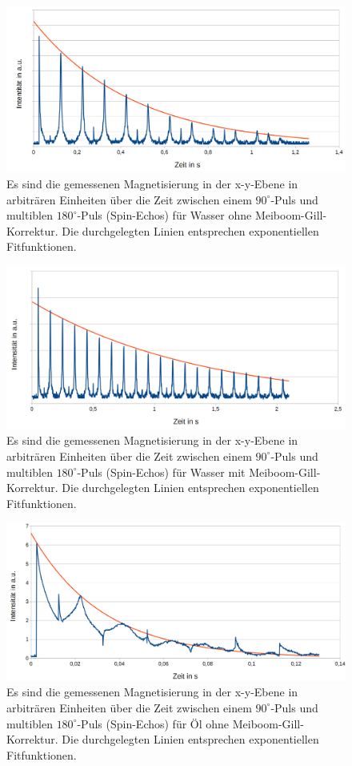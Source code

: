 \documentclass[numbers=noenddot,a4paper,notitlepage,twoside,BCOR15mm]{scrartcl}
\begin{document}
	\begin{figure}[!h]
		\centering
		\includegraphics[width=1\textwidth]{pics/T2_H2O}
		\caption{Es sind die gemessenen Magnetisierung in der x-y-Ebene in arbiträren Einheiten über die Zeit zwischen einem $90^\circ$-Puls und multiblen $180^\circ$-Puls (Spin-Echos) für Wasser ohne Meiboom-Gill-Korrektur. Die durchgelegten Linien entsprechen exponentiellen Fitfunktionen.}
		\label{abb:T2_H2O}
	\end{figure}
	\begin{figure}[h]
		\centering
		\includegraphics[width=1\textwidth]{pics/T2_H2O_MG}
		\caption{Es sind die gemessenen Magnetisierung in der x-y-Ebene in arbiträren Einheiten über die Zeit zwischen einem $90^\circ$-Puls und multiblen $180^\circ$-Puls (Spin-Echos) für Wasser mit Meiboom-Gill-Korrektur. Die durchgelegten Linien entsprechen exponentiellen Fitfunktionen.}
		\label{abb:T2_H2O_MG}
	\end{figure}
	\begin{figure}[h]
		\centering
		\includegraphics[width=1\textwidth]{pics/T2_Oel}
		\caption{Es sind die gemessenen Magnetisierung in der x-y-Ebene in arbiträren Einheiten über die Zeit zwischen einem $90^\circ$-Puls und multiblen $180^\circ$-Puls (Spin-Echos) für Öl ohne Meiboom-Gill-Korrektur. Die durchgelegten Linien entsprechen exponentiellen Fitfunktionen.}
		\label{abb:T2_Oel}
	\end{figure}
\end{document}
